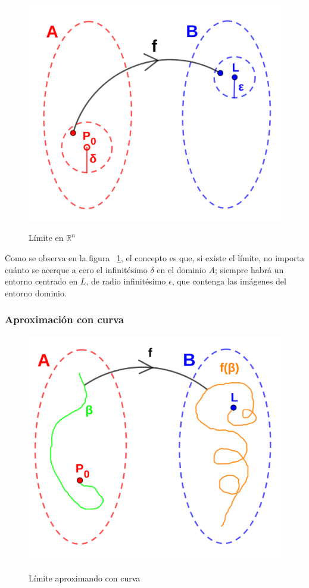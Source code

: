 \documentclass{article}
\renewcommand{\Bbb}{\mathbb}
\begin{document}
\begin{figure}[ht]
\caption{Límite en $\Bbb R^n$}
\includegraphics[scale=0.75]{img/limite/limite.png} 
\centering
\label{fig:limite}
\end{figure}

Como se observa en la figura ~\ref{fig:limite}, el concepto es que, si existe el límite, no importa cuánto se acerque a cero el infinitésimo $\delta$ en el dominio $A$; siempre habrá un entorno centrado en $L$, de radio infinitésimo $\epsilon$, que contenga las imágenes del entorno dominio.

\subsubsection{Aproximación con curva}

\begin{figure}[ht]
\caption{Límite aproximando con curva}
\includegraphics[scale=0.75]{img/limite/limite_curva.png}
\centering
\label{fig:limite_curva}
\end{figure}
\end{document}
